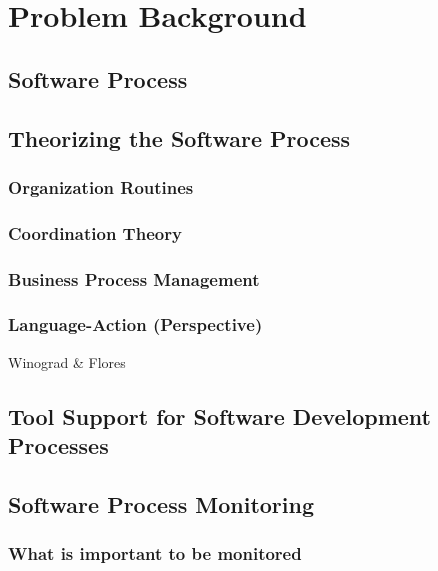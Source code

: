 \chapter{Problem Background}
\label{ch2:problem-background}

\section{Software Process}
\label{sec:ch2-software-process}

\section{Theorizing the Software Process}
\label{sec:ch2-theorizing}

\subsection{Organization Routines}
\label{subsec:org-stud}

\subsection{Coordination Theory}

\subsection{Business Process Management}

\subsection{Language-Action (Perspective)}

Winograd \& Flores~\cite{Winograd1986a}

\section{Tool Support for Software Development Processes}
\label{sec:ch2-tool-support}

\section{Software Process Monitoring }
\label{sec:ch2-sw-p-monitoring}

\subsection{What is important to be monitored}

